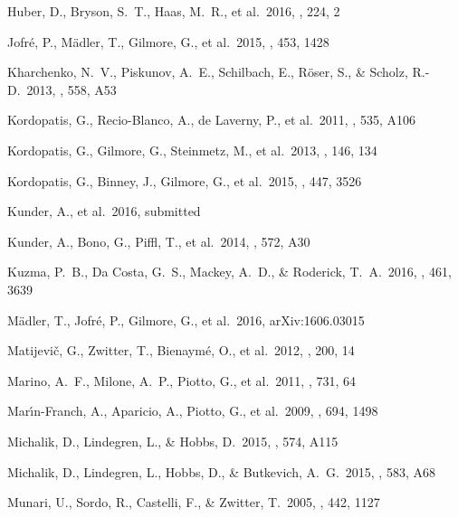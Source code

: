 \documentclass[preprint]{aastex}
\begin{document}
\begin{thebibliography}{dummy}
 Huber, D., Bryson, S.~T., Haas, M.~R., et al.\ 2016, \apjs, 224, 2 

 Jofr{\'e}, P., M{\"a}dler, T., Gilmore, G., et al.\ 2015, \mnras, 453, 1428 

 Kharchenko, N.~V., Piskunov, A.~E., Schilbach, E., R{\"o}ser, S., \& Scholz, R.-D.\ 2013, \aap, 558, A53 

 Kordopatis, G., Recio-Blanco, A., de Laverny, P., et al.\ 2011, \aap, 535, A106 

 Kordopatis, G., Gilmore, G., Steinmetz, M., et al.\ 2013, \aj, 146, 134 

 Kordopatis, G., Binney, J., Gilmore, G., et al.\ 2015, \mnras, 447, 3526 

 Kunder, A., et al.\ 2016, submitted

 Kunder, A., Bono, G., Piffl, T., et al.\ 2014, \aap, 572, A30 

 Kuzma, P.~B., Da Costa, G.~S., Mackey, A.~D., \& Roderick, T.~A.\ 2016, \mnras, 461, 3639 

 M{\"a}dler, T., Jofr{\'e}, P., Gilmore, G., et al.\ 2016, arXiv:1606.03015 

 Matijevi{\v c}, G., Zwitter, T., Bienaym{\'e}, O., et al.\ 2012, \apjs, 200, 14 

 Marino, A.~F., Milone, A.~P., Piotto, G., et al.\ 2011, \apj, 731, 64 

 Mar{\'{\i}}n-Franch, A., Aparicio, A., Piotto, G., et al.\ 2009, \apj, 694, 1498 

 Michalik, D., Lindegren, L., \& Hobbs, D.\ 2015, \aap, 574, A115 

 Michalik, D., Lindegren, L., Hobbs, D., \& Butkevich, A.~G.\ 2015, \aap, 583, A68 

 Munari, U., Sordo, R., Castelli, F., \& Zwitter, T.\ 2005, \aap, 442, 1127 


\end{thebibliography}
\end{document}
